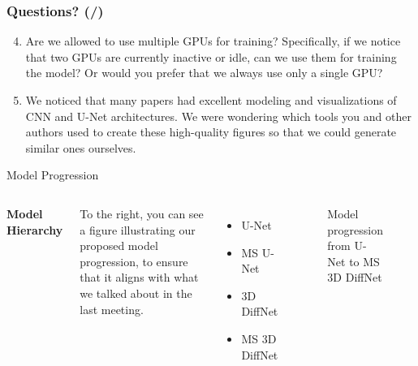\documentclass[t,24pt]{beamer}
\newcounter{currentQSlide}
\newcounter{totalQSlide}
\newcommand{\incrementQSlideCnt}{%
    \stepcounter{currentQSlide}
}
\begin{document}

\begin{frame}[hoved]
\incrementQSlideCnt
\frametitle{Questions? (\thecurrentQSlide/\thetotalQSlide)}
\begin{enumerate}
\setcounter{enumi}{3}
\item Are we allowed to use multiple GPUs for training? Specifically, if we notice that two GPUs are currently inactive or idle, can we use them for training the model? Or would you prefer that we always use only a single GPU?
\item We noticed that many papers had excellent modeling and visualizations of CNN and U-Net architectures. We were wondering which tools you and other authors used to create these high-quality figures so that we could generate similar ones ourselves.
\end{enumerate}
\end{frame}


\begin{frame}{Model Progression}
    \begin{columns}
        \textbf{Model Hierarchy}
        
        \vspace{0.5cm}
        To the right, you can see a figure illustrating our proposed model progression, to ensure that it aligns with what we talked about in the last meeting.
        \begin{itemize}
            \item U-Net
            \item MS U-Net
            \item 3D DiffNet
            \item MS 3D DiffNet
        \end{itemize}

        \vspace{-1.5cm}
        \begin{figure}
            \centering
            \caption{Model progression from U-Net to MS 3D DiffNet}
            \label{fig:model_progression}
        \end{figure}
    \end{columns}
\end{frame}
\end{document}
